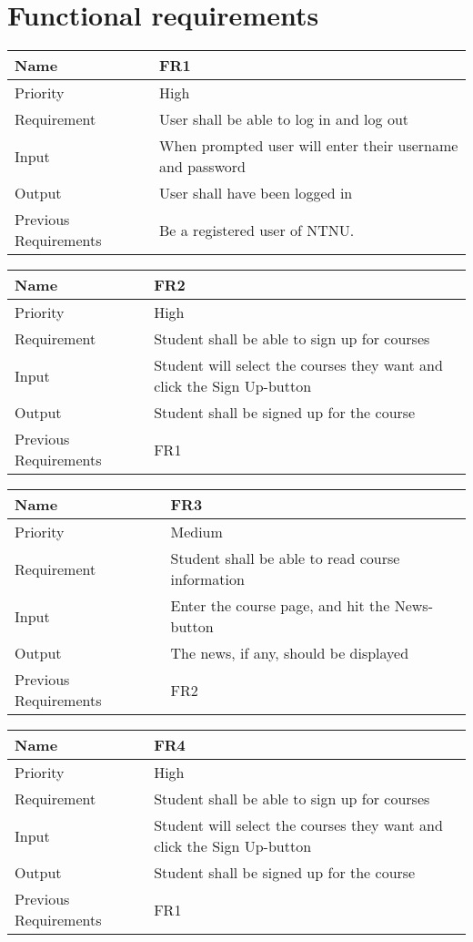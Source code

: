 \section{Functional requirements}

\begin{tabularx}{\textwidth}{|l|X|}
  \hline
  Name & FR1 \\ \hline
  Priority & High \\ \hline
  Requirement & User shall be able to log in and log out \\ \hline
  Input & When prompted user will enter their username and password \\ \hline
  Output & User shall have been logged in \\ \hline
  Previous Requirements & Be a registered user of NTNU. \\ \hline
\end{tabularx}

\begin{tabularx}{\textwidth}{|l|X|}
  \hline
  Name & FR2 \\ \hline
  Priority & High \\ \hline
  Requirement & Student shall be able to sign up for courses \\ \hline
  Input & Student will select the courses they want and click the Sign Up-button \\ \hline
  Output & Student shall be signed up for the course \\ \hline
  Previous Requirements & FR1 \\ \hline
\end{tabularx}

\begin{tabularx}{\textwidth}{|l|X|}
  \hline
  Name & FR3 \\ \hline
  Priority & Medium \\ \hline
  Requirement & Student shall be able to read course information \\ \hline
  Input & Enter the course page, and hit the News-button \\ \hline
  Output & The news, if any, should be displayed \\ \hline
  Previous Requirements & FR2 \\ \hline
\end{tabularx}

\begin{tabularx}{\textwidth}{|l|X|}
  \hline
  Name & FR4 \\ \hline
  Priority & High \\ \hline
  Requirement & Student shall be able to sign up for courses \\ \hline
  Input & Student will select the courses they want and click the Sign Up-button \\ \hline
  Output & Student shall be signed up for the course \\ \hline
  Previous Requirements & FR1 \\ \hline
\end{tabularx}

